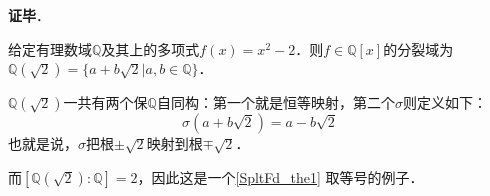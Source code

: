 














\textbf{证毕}．





\begin{example}{}

给定有理数域$\mathbb{Q}$及其上的多项式$f(x)=x^2-2$．则$f\in\mathbb{Q}[x]$的分裂域为$\mathbb{Q}(\sqrt{2})=\{a+b\sqrt{2}|a, b\in\mathbb{Q}\}$．

$\mathbb{Q}(\sqrt{2})$一共有两个保$\mathbb{Q}$自同构：第一个就是恒等映射，第二个$\sigma$则定义如下：
\begin{equation}
\sigma(a+b\sqrt{2})=a-b\sqrt{2}
\end{equation}
也就是说，$\sigma$把根$\pm\sqrt{2}$映射到根$\mp\sqrt{2}$．


而$[\mathbb{Q}(\sqrt{2}):\mathbb{Q}]=2$，因此这是一个\autoref{SpltFd_the1} 取等号的例子．

\end{example}


